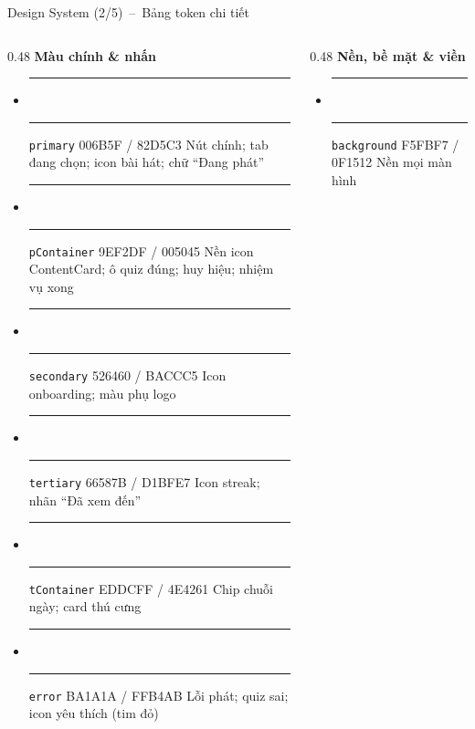\documentclass[aspectratio=169]{beamer}
\begin{document}
\begin{frame}{Design System (2/5)~--~Bảng token chi tiết}
  \begin{columns}
    \begin{column}{0.48\textwidth}
      {\scriptsize\textbf{Màu chính \& nhấn}}\vspace{1mm}
      {\tiny
      \begin{itemize}\itemsep4pt
        \item \textcolor[HTML]{006B5F}{\rule[-2.5pt]{13pt}{13pt}}\,\textcolor[HTML]{82D5C3}{\rule[-2.5pt]{13pt}{13pt}} \texttt{primary} 006B5F / 82D5C3 \newline Nút chính; tab đang chọn; icon bài hát; chữ ``Đang phát''
        \item \textcolor[HTML]{9EF2DF}{\rule[-2.5pt]{13pt}{13pt}}\,\textcolor[HTML]{005045}{\rule[-2.5pt]{13pt}{13pt}} \texttt{pContainer} 9EF2DF / 005045 \newline Nền icon ContentCard; ô quiz đúng; huy hiệu; nhiệm vụ xong
        \item \textcolor[HTML]{526460}{\rule[-2.5pt]{13pt}{13pt}}\,\textcolor[HTML]{BACCC5}{\rule[-2.5pt]{13pt}{13pt}} \texttt{secondary} 526460 / BACCC5 \newline Icon onboarding; màu phụ logo
        \item \textcolor[HTML]{66587B}{\rule[-2.5pt]{13pt}{13pt}}\,\textcolor[HTML]{D1BFE7}{\rule[-2.5pt]{13pt}{13pt}} \texttt{tertiary} 66587B / D1BFE7 \newline Icon streak; nhãn ``Đã xem đến''
        \item \textcolor[HTML]{EDDCFF}{\rule[-2.5pt]{13pt}{13pt}}\,\textcolor[HTML]{4E4261}{\rule[-2.5pt]{13pt}{13pt}} \texttt{tContainer} EDDCFF / 4E4261 \newline Chip chuỗi ngày; card thú cưng
        \item \textcolor[HTML]{BA1A1A}{\rule[-2.5pt]{13pt}{13pt}}\,\textcolor[HTML]{FFB4AB}{\rule[-2.5pt]{13pt}{13pt}} \texttt{error} BA1A1A / FFB4AB \newline Lỗi phát; quiz sai; icon yêu thích (tim đỏ)
      \end{itemize}}
    \end{column}
    \begin{column}{0.48\textwidth}
      {\scriptsize\textbf{Nền, bề mặt \& viền}}\vspace{1mm}
      {\tiny
      \begin{itemize}\itemsep4pt
        \item \textcolor[HTML]{F5FBF7}{\rule[-2.5pt]{13pt}{13pt}}\,\textcolor[HTML]{0F1512}{\rule[-2.5pt]{13pt}{13pt}} \texttt{background} F5FBF7 / 0F1512 \newline Nền mọi màn hình

\end{itemize}}
\end{column}
\end{columns}
\end{frame}
\end{document}
